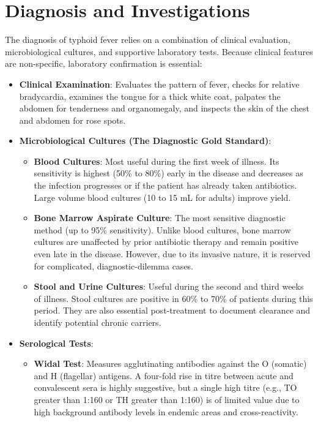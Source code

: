 \section*{Diagnosis and Investigations}
The diagnosis of typhoid fever relies on a combination of clinical evaluation, microbiological cultures, and supportive laboratory tests. Because clinical features are non-specific, laboratory confirmation is essential:
\begin{itemize}
  \item \textbf{Clinical Examination}: Evaluates the pattern of fever, checks for relative bradycardia, examines the tongue for a thick white coat, palpates the abdomen for tenderness and organomegaly, and inspects the skin of the chest and abdomen for rose spots.
  \item \textbf{Microbiological Cultures (The Diagnostic Gold Standard)}:
  \begin{itemize}
    \item \textbf{Blood Cultures}: Most useful during the first week of illness. Its sensitivity is highest (50\% to 80\%) early in the disease and decreases as the infection progresses or if the patient has already taken antibiotics. Large volume blood cultures (10 to 15 mL for adults) improve yield.
    \item \textbf{Bone Marrow Aspirate Culture}: The most sensitive diagnostic method (up to 95\% sensitivity). Unlike blood cultures, bone marrow cultures are unaffected by prior antibiotic therapy and remain positive even late in the disease. However, due to its invasive nature, it is reserved for complicated, diagnostic-dilemma cases.
    \item \textbf{Stool and Urine Cultures}: Useful during the second and third weeks of illness. Stool cultures are positive in 60\% to 70\% of patients during this period. They are also essential post-treatment to document clearance and identify potential chronic carriers.
  \end{itemize}
  \item \textbf{Serological Tests}:
  \begin{itemize}
    \item \textbf{Widal Test}: Measures agglutinating antibodies against the O (somatic) and H (flagellar) antigens. A four-fold rise in titre between acute and convalescent sera is highly suggestive, but a single high titre (e.g., TO greater than 1:160 or TH greater than 1:160) is of limited value due to high background antibody levels in endemic areas and cross-reactivity.

\end{itemize}
\end{itemize}
